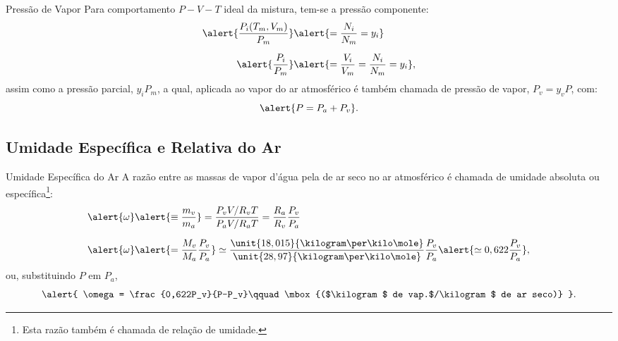     \begin{frame}{Pressão de Vapor}\vspace*{-0em}
        Para \alert{comportamento $P-V-T$ ideal} da mistura, tem-se a \alert{pressão
        componente}:
        \begin{align*}
            \alert{\frac{P_{i}(T_m, V_m)}{P_m}} &
            \alert{=\frac{N_{i}}{N_m} = y_{i}}
            \\[\medskipamount]
            \alert{\frac{P_i}{P_m}} &
            \alert{=\frac{V_i}{V_m} = \frac{N_i}{N_m} = y_i},
        \end{align*}
        assim como a \alert{pressão parcial}, \alert{$y_iP_m$}, a qual, aplicada ao vapor do ar
        atmosférico é também chamada de \alert{pressão de vapor}, \alert{$P_v = y_vP$}, com:
        \begin{equation*}
            \alert{
                P = P_a + P_v
            }.
        \end{equation*}
    \end{frame}

\subsection{Umidade Específica e Relativa do Ar}

    \begin{frame}{Umidade Específica do Ar}\vspace*{-0em}
        A razão entre as massas de vapor d'água pela de ar seco no ar atmosférico é chamada de
        \alert{umidade absoluta} ou \alert{específica}\footnote{Esta razão também é chamada de
        \alert{relação de umidade}.}:
        \begin{align*}
            \alert{\omega} &
            \alert{\equiv\frac{m_v}{m_a}}
            = \frac{P_vV/R_vT}{P_aV/R_aT} = \frac{R_a}{R_v}\frac{P_v}{P_a}
            \\[\medskipamount]
            \alert{\omega} &
            \alert{= \frac{M_v}{M_a}\frac{P_v}{P_a}}
            \simeq
            \frac{\unit{18,015}{\kilogram\per\kilo\mole}}{\unit{28,97}{\kilogram\per\kilo\mole}}
            \frac{P_v}{P_a}
            \alert{\simeq 0,622\frac{P_v}{P_a}},
        \end{align*}
        ou, substituindo $P$ em $P_a$,
        \begin{equation*}
            \alert{
                \omega = \frac{0,622P_v}{P-P_v}\qquad
                \mbox{($\kilogram$ de vap.$/\kilogram$ de ar seco)}
            }.
        \end{equation*}
    \end{frame}

